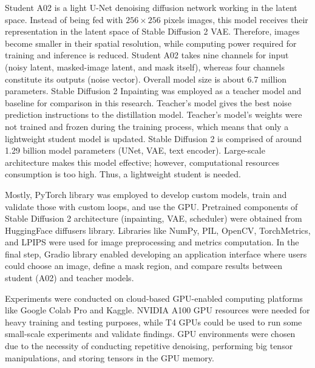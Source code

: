 \documentclass[journal]{IEEEtran}
\begin{document}
Student A02 is a light U-Net denoising diffusion network working in the latent space. Instead of being fed with $256\times256$ pixels images, this model receives their representation in the latent space of Stable Diffusion 2 VAE. Therefore, images become smaller in their spatial resolution, while computing power required for training and inference is reduced. Student A02 takes nine channels for input (noisy latent, masked-image latent, and mask itself), whereas four channels constitute its outputs (noise vector). Overall model size is about 6.7 million parameters. Stable Diffusion 2 Inpainting was employed as a teacher model and baseline for comparison in this research. Teacher's model gives the best noise prediction instructions to the distillation model. Teacher's model's weights were not trained and frozen during the training process, which means that only a lightweight student model is updated. Stable Diffusion 2 is comprised of around 1.29 billion model parameters (UNet, VAE, text encoder). Large-scale architecture makes this model effective; however, computational resources consumption is too high. Thus, a lightweight student is needed.

Mostly, PyTorch library was employed to develop custom models, train and validate those with custom loops, and use the GPU. Pretrained components of Stable Diffusion 2 architecture (inpainting, VAE, scheduler) were obtained from HuggingFace diffusers library. Libraries like NumPy, PIL, OpenCV, TorchMetrics, and LPIPS were used for image preprocessing and metrics computation. In the final step, Gradio library enabled developing an application interface where users could choose an image, define a mask region, and compare results between student (A02) and teacher models.

Experiments were conducted on cloud-based GPU-enabled computing platforms like Google Colab Pro and Kaggle. NVIDIA A100 GPU resources were needed for heavy training and testing purposes, while T4 GPUs could be used to run some small-scale experiments and validate findings. GPU environments were chosen due to the necessity of conducting repetitive denoising, performing big tensor manipulations, and storing tensors in the GPU memory.
\end{document}
